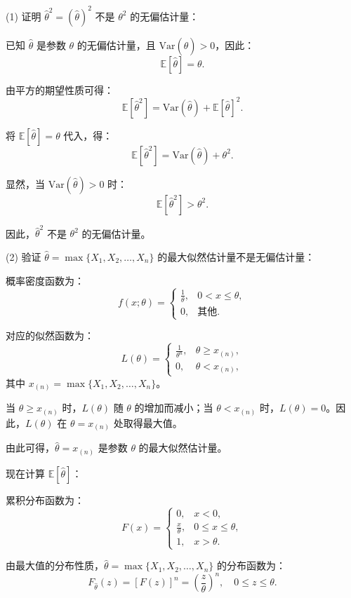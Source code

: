 \documentclass[twoside]{article}
\begin{document}
\begin{ans}{13}{13}
    (1) 证明 \(\hat{\theta}^2 = (\hat{\theta})^2\) 不是 \(\theta^2\) 的无偏估计量：

已知 \(\hat{\theta}\) 是参数 \(\theta\) 的无偏估计量，且 \(\text{Var}(\hat{\theta}) > 0\)，因此：
\[
\mathbb{E}[\hat{\theta}] = \theta.
\]

由平方的期望性质可得：
\[
\mathbb{E}[\hat{\theta}^2] = \text{Var}(\hat{\theta}) + \mathbb{E}[\hat{\theta}]^2.
\]

将 \(\mathbb{E}[\hat{\theta}] = \theta\) 代入，得：
\[
\mathbb{E}[\hat{\theta}^2] = \text{Var}(\hat{\theta}) + \theta^2.
\]

显然，当 \(\text{Var}(\hat{\theta}) > 0\) 时：
\[
\mathbb{E}[\hat{\theta}^2] > \theta^2.
\]

因此，\(\hat{\theta}^2\) 不是 \(\theta^2\) 的无偏估计量。

(2) 验证 \(\hat{\theta} = \max\{X_1, X_2, \dots, X_n\}\) 的最大似然估计量不是无偏估计量：

概率密度函数为：
\[
f(x; \theta) = 
\begin{cases} 
\frac{1}{\theta}, & 0 < x \leq \theta, \\
0, & \text{其他}.
\end{cases}
\]

对应的似然函数为：
\[
L(\theta) = 
\begin{cases} 
\frac{1}{\theta^n}, & \theta \geq x_{(n)}, \\
0, & \theta < x_{(n)},
\end{cases}
\]
其中 \(x_{(n)} = \max\{X_1, X_2, \dots, X_n\}\)。

当 \(\theta \geq x_{(n)}\) 时，\(L(\theta)\) 随 \(\theta\) 的增加而减小；当 \(\theta < x_{(n)}\) 时，\(L(\theta) = 0\)。因此，\(L(\theta)\) 在 \(\theta = x_{(n)}\) 处取得最大值。

由此可得，\(\hat{\theta} = x_{(n)}\) 是参数 \(\theta\) 的最大似然估计量。

现在计算 \(\mathbb{E}[\hat{\theta}]\)：

累积分布函数为：
\[
F(x) = 
\begin{cases} 
0, & x < 0, \\
\frac{x}{\theta}, & 0 \leq x \leq \theta, \\
1, & x > \theta.
\end{cases}
\]

由最大值的分布性质，\(\hat{\theta} = \max\{X_1, X_2, \dots, X_n\}\) 的分布函数为：
\[
F_{\hat{\theta}}(z) = [F(z)]^n = \left(\frac{z}{\theta}\right)^n, \quad 0 \leq z \leq \theta.
\]


\end{ans}
\end{document}
